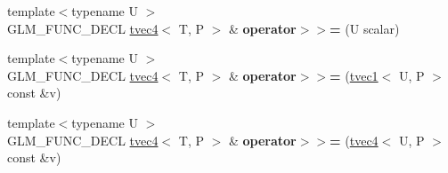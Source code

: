 \begin{DoxyCompactItemize}
\item 
\hypertarget{structglm_1_1tvec4_a6864c1240c7b96bc2ece0dca52eeaa78}{{\footnotesize template$<$typename U $>$ }\\G\-L\-M\-\_\-\-F\-U\-N\-C\-\_\-\-D\-E\-C\-L \hyperlink{structglm_1_1tvec4}{tvec4}$<$ T, P $>$ \& {\bfseries operator$>$$>$=} (U scalar)}\label{structglm_1_1tvec4_a6864c1240c7b96bc2ece0dca52eeaa78}

\item 
\hypertarget{structglm_1_1tvec4_a941c7db66248a949a46e398b8f9f15ce}{{\footnotesize template$<$typename U $>$ }\\G\-L\-M\-\_\-\-F\-U\-N\-C\-\_\-\-D\-E\-C\-L \hyperlink{structglm_1_1tvec4}{tvec4}$<$ T, P $>$ \& {\bfseries operator$>$$>$=} (\hyperlink{structglm_1_1tvec1}{tvec1}$<$ U, P $>$ const \&v)}\label{structglm_1_1tvec4_a941c7db66248a949a46e398b8f9f15ce}

\item 
\hypertarget{structglm_1_1tvec4_a36837fd895234f73e2e76aedb39712b2}{{\footnotesize template$<$typename U $>$ }\\G\-L\-M\-\_\-\-F\-U\-N\-C\-\_\-\-D\-E\-C\-L \hyperlink{structglm_1_1tvec4}{tvec4}$<$ T, P $>$ \& {\bfseries operator$>$$>$=} (\hyperlink{structglm_1_1tvec4}{tvec4}$<$ U, P $>$ const \&v)}\label{structglm_1_1tvec4_a36837fd895234f73e2e76aedb39712b2}

\end{DoxyCompactItemize}
